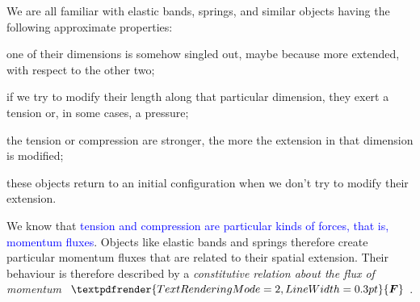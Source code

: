 \documentclass[a4paper,12pt,%
onecolumn,oneside,titlepage,%
british%
]{memoir}
\renewcommand*{\bm}[1]{\textpdfrender{TextRenderingMode=2,LineWidth=0.3pt}{\boldsymbol{#1}}}
\renewcommand*{\|}[1][]{\nonscript\:#1\vert\nonscript\:\mathopen{}}
\newcommand*{\sect}{\S}%
\renewcommand*{\autoref}[2]{\sidepar{\vspace{-1ex}\footnotesize{\color{blue}\faIcon{%
reply%
}\enspace\sect\,\ref{#1} page\,\pageref{#1}}}\textcolor{blue}{#2}}
\newcommand*{\yF}{\bm{F}}
\begin{document}
%
We are all familiar with elastic bands, springs, and similar objects having the following approximate properties:
\begin{enumerate*}[label=(\alph*)]
\item one of their dimensions is somehow singled out, maybe because more extended, with respect to the other two;
\item if we try to modify their length along that particular dimension, they exert a tension or, in some cases, a pressure;
\item the tension or compression are stronger, the more the extension in that dimension is modified;
\item these objects return to an initial configuration when we don't try to modify their extension.
\end{enumerate*}

We know that \autoref{sec:pressure_tension_shear}{tension and compression are particular kinds of forces, that is, momentum fluxes}. Objects like elastic bands and springs therefore create particular momentum fluxes that are related to their spatial extension. Their behaviour is therefore described by a \emph{constitutive relation about the flux of momentum $\yF$}.
\end{document}
